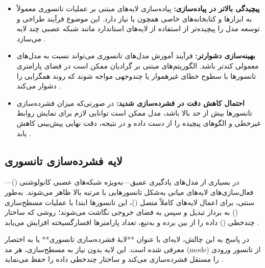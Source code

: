 \begin{itemize}
	\item \textbf{پیچیدگی بالاتر در پیاده‌سازی:} پیاده‌سازی لایه‌های مبتنی بر عملیات تانسوری معمولاً به ابزارها و کتابخانه‌های خاصی همچون  یا  نیاز دارد. این موضوع فرآیند طراحی و توسعه مدل را پیچیده‌تر از استفاده از لایه‌های استاندارد مانند شبکه عصبی چند لایه می‌سازد \cite{kossaifi2017tensorcontraction}.
	
	\item \textbf{بهینه‌سازی دشوارتر:} فرآیند آموزش مدل‌های تانسوری می‌تواند نسبت به مدل‌های معمولی کندتر باشد. الگوریتم‌های مبتنی بر گرادیان ممکن است در فضای پارامتری تانسورها با سطوح خطای غیرهموار یا چندوجهی مواجه شوند که روند همگرایی را دشوار می‌کند \cite{yang2017ttrnn}.
	
	\item \textbf{احتمال کاهش دقت در فشرده‌سازی شدید:} در صورتی‌که میزان فشرده‌سازی تانسورها بیش از حد بالا باشد، مدل ممکن است توانایی لازم برای نمایش روابط غیرخطی و الگوهای پیچیده را از دست داده و در نتیجه، دقت نهایی پیش‌بینی کاهش یابد \cite{kossaifi2020tensorregression}.
\end{itemize}



\subsection{لایه فشرده‌سازی تانسوری}



در بسیاری از مدل‌های یادگیری عمیق—به‌ویژه شبکه‌های عصبی کانولوشنی ()—فعال‌سازی‌های لایه‌های میانی به‌شکل تانسورهایی با مرتبه بالا ظاهر می‌شوند. به‌طور سنتی، برای اعمال لایه‌های کاملاً متصل ()، این تانسورها ابتدا با عملیات مسطح‌سازی () به بردار تبدیل و سپس به فضای خروجی نگاشت می‌شوند؛ روشی که ساختار چندخطی () داده را از بین برده و به‌تبع، تعداد پارامترها افسارگسیخته افزایش می‌یابد \cite{kossaifi2020tensorregression}.

در پاسخ به این چالش، لایه‌ای با عنوان **­لایهٔ فشرده‌سازی تانسوری** یا به اختصار  معرفی شده است. این لایه بدون نیاز به مسطح‌سازی، هر مد (mode) از تانسور ورودی را مستقل فشرده‌سازی می‌کند و ساختار چندخطی داده را حفظ می‌نماید \cite{kossaifi2017tensorcontraction,kossaifi2020tensorregression}.



